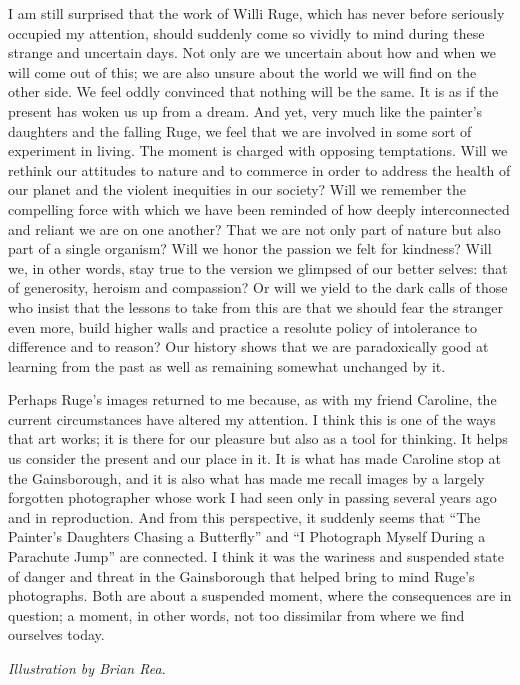I am still surprised that the work of Willi Ruge, which has never before
seriously occupied my attention, should suddenly come so vividly to mind
during these strange and uncertain days. Not only are we uncertain about
how and when we will come out of this; we are also unsure about the
world we will find on the other side. We feel oddly convinced that
nothing will be the same. It is as if the present has woken us up from a
dream. And yet, very much like the painter's daughters and the falling
Ruge, we feel that we are involved in some sort of experiment in living.
The moment is charged with opposing temptations. Will we rethink our
attitudes to nature and to commerce in order to address the health of
our planet and the violent inequities in our society? Will we remember
the compelling force with which we have been reminded of how deeply
interconnected and reliant we are on one another? That we are not only
part of nature but also part of a single organism? Will we honor the
passion we felt for kindness? Will we, in other words, stay true to the
version we glimpsed of our better selves: that of generosity, heroism
and compassion? Or will we yield to the dark calls of those who insist
that the lessons to take from this are that we should fear the stranger
even more, build higher walls and practice a resolute policy of
intolerance to difference and to reason? Our history shows that we are
paradoxically good at learning from the past as well as remaining
somewhat unchanged by it.

Perhaps Ruge's images returned to me because, as with my friend
Caroline, the current circumstances have altered my attention. I think
this is one of the ways that art works; it is there for our pleasure but
also as a tool for thinking. It helps us consider the present and our
place in it. It is what has made Caroline stop at the Gainsborough, and
it is also what has made me recall images by a largely forgotten
photographer whose work I had seen only in passing several years ago and
in reproduction. And from this perspective, it suddenly seems that ``The
Painter's Daughters Chasing a Butterfly'' and ``I Photograph Myself
During a Parachute Jump'' are connected. I think it was the wariness and
suspended state of danger and threat in the Gainsborough that helped
bring to mind Ruge's photographs. Both are about a suspended moment,
where the consequences are in question; a moment, in other words, not
too dissimilar from where we find ourselves today.

\emph{Illustration by Brian Rea.}

